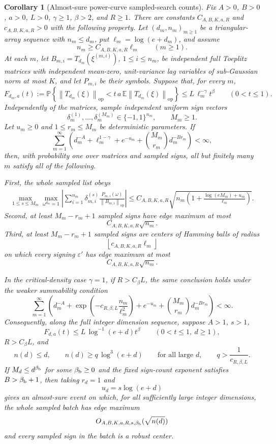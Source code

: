 \documentclass[11pt]{amsart}
\numberwithin{equation}{section}
\newtheorem{corollary}[theorem]{Corollary}
\theoremstyle{definition}
\theoremstyle{remark}
\newcommand{\op}{\mathrm{op}}
\newcommand{\Prob}{\mathbb P}
\newcommand{\Exp}{\mathbb E}
\newcommand{\norm}[1]{\left\lVert #1\right\rVert}
\newcommand{\eps}{\varepsilon}
\begin{document}
\begin{corollary}[Almost-sure power-curve sampled-search counts]
\label{cor:normalizer-tail-power-borel-counts}
Fix \(A>0\), \(B>0\), \(a>0\), \(L>0\), \(\gamma\ge1\), \(\beta>2\), and
\(R\ge1\).  There are constants \(C_{A,B,K,a,R}\) and \(c_{A,B,K,a,R}>0\) with
the following property.  Let \((d_m,n_m)_{m\ge1}\) be a triangular-array sequence
with \(n_m\le d_m\), put \(\ell_m=\log(e+d_m)\), and assume
\[
  n_m\ge C_{A,B,K,a,R}\ell_m \qquad(m\ge1).
\]
At each \(m\), let \(B_{m,i}=T_{d_m}(\xi^{(m,i)})\), \(1\le i\le n_m\), be
independent full Toeplitz matrices with independent mean-zero, unit-variance lag
variables of sub-Gaussian norm at most \(K\), and let \(P_{m,i}\) be their
symbols.  Suppose that, for every \(m\),
\[
  F_{d_m,a}(t):=
  \Prob\left\{\norm{T_{d_m}(\xi)}_{\op}
  <t\,a\,\Exp\norm{T_{d_m}(\xi)}_{\op}\right\}
  \le L\,\ell_m^{-\gamma}t^\beta
  \qquad(0<t\le1).
\]
Independently of the matrices, sample independent uniform sign vectors
\[
  \delta_m^{(1)},\ldots,\delta_m^{(M_m)}\in\{-1,1\}^{n_m},
  \qquad M_m\ge1 .
\]
Let \(u_m\ge0\) and \(1\le r_m\le M_m\) be deterministic parameters.  If
\[
  \sum_{m=1}^{\infty}
  \left(d_m^{-A}+\ell_m^{1-\gamma}+e^{-u_m}
  +\binom{M_m}{r_m}d_m^{-B r_m}\right)<\infty,
\]
then, with probability one over matrices and sampled signs, all but finitely many
\(m\) satisfy all of the following.

First, the whole sampled list obeys
\[
\begin{aligned}
  \max_{1\le s\le M_m}\max_{\omega^{d_m}=1}
  \left|\sum_{i=1}^{n_m}\delta_{m,i}^{(s)}
  \frac{P_{m,i}(\omega)}{\norm{B_{m,i}}_{\op}}\right|
  \le
  C_{A,B,K,a,R}\sqrt{
    n_m\left(1+\frac{\log(eM_m)+u_m}{\ell_m}\right)} .
\end{aligned}
\]
Second, at least \(M_m-r_m+1\) sampled signs have edge maximum at most
\[
  C_{A,B,K,a,R}\sqrt{n_m}.
\]
Third, at least \(M_m-r_m+1\) sampled signs are centers of Hamming balls of
radius
\[
  \left\lfloor c_{A,B,K,a,R}\ell_m\right\rfloor
\]
on which every signing \(\eps'\) has edge maximum at most
\[
  C_{A,B,K,a,R}\sqrt{n_m}.
\]

In the critical-density case \(\gamma=1\), if \(R>C_\beta L\), the same
conclusion holds under the weaker summability condition
\[
  \sum_{m=1}^{\infty}
  \left(d_m^{-A}
  +\exp\left(-c_{R,\beta,L}\frac{n_m}{\ell_m^2}\right)
  +e^{-u_m}
  +\binom{M_m}{r_m}d_m^{-B r_m}\right)<\infty .
\]
Consequently, along the full integer dimension sequence, suppose \(A>1\),
\(s>1\),
\[
  F_{d,a}(t)\le L\,\log^{-1}(e+d)t^\beta
  \qquad(0<t\le1,\ d\ge1),
\]
\(R>C_\beta L\), and
\[
  n(d)\le d,\qquad
  n(d)\ge q\,\log^3(e+d)
  \qquad\text{for all large }d,\qquad
  q>\frac1{c_{R,\beta,L}} .
\]
If \(M_d\le d^{\beta_{\rm b}}\) for some \(\beta_{\rm b}\ge0\) and the fixed
sign-count exponent satisfies \(B>\beta_{\rm b}+1\), then taking \(r_d=1\) and
\[
  u_d=s\log(e+d)
\]
gives an almost-sure event on which, for all sufficiently large integer
dimensions, the whole sampled batch has edge maximum
\[
  O_{A,B,K,a,R,s,\beta_{\rm b}}(\sqrt{n(d)})
\]
and every sampled sign in the batch is a robust center.
\end{corollary}
\end{document}
